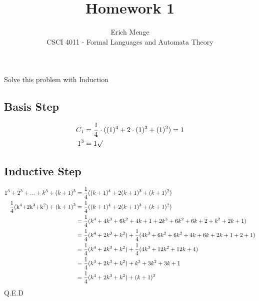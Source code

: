 \documentclass[12pt]{article}
\newenvironment{problem}[2][Problem]{\begin{trivlist}
\item[\hskip \labelsep {\bfseries #1}\hskip \labelsep {\bfseries #2.}]}{\end{trivlist}}
\begin{document}

\title{Homework 1}%
\author{Erich Menge\\ %
CSCI 4011 - Formal Languages and Automata Theory} %

\maketitle

\begin{problem}{1}
Solve this problem with Induction \\
\subsection*{Basis Step}
\begin{align*}
{C_1} &= \frac{1}{4} \cdot ({(1)^4} + 2 \cdot {(1)^3} + {(1)^2}) = 1\\
{1^3} &= 1\surd
\end{align*}
\subsection*{Inductive Step}
\begin{align*}
{1^3} + {2^3} + ... + {k^3} + {(k + 1)^3} &= \frac{1}{4}({(k + 1)^4} + 2{(k + 1)^3} + {(k + 1)^2})\\
\frac{1}{4}{\rm{(}}{{\rm{k}}^4}{\rm{  +  2}}{{\rm{k}}^3}{\rm{  +  }}{{\rm{k}}^2}{\rm{)  +  (k  +  1}}{{\rm{)}}^3} &= \frac{1}{4}({(k + 1)^4} + 2{(k + 1)^3} + {(k + 1)^2})\\
& = \frac{1}{4}({k^4} + 4{k^3} + 6{k^2} + 4k + 1 + 2{k^3} + 6{k^2} + 6k + 2 + {k^2} + 2k + 1)\\
& = \frac{1}{4}({k^4} + 2{k^3} + {k^2}) + \frac{1}{4}(4{k^3} + 6{k^2} + 6{k^2} + 4k + 6k + 2k + 1 + 2 + 1)\\
& = \frac{1}{4}({k^4} + 2{k^3} + {k^2}) + \frac{1}{4}(4{k^3} + 12{k^2} + 12k + 4)\\
& = \frac{1}{4}({k^4} + 2{k^3} + {k^2}) + {k^3} + 3{k^2} + 3k + 1\\
& = \frac{1}{4}({k^4} + 2{k^3} + {k^2}) + {(k + 1)^3}
\end{align*}
\hfill Q.E.D
\end{problem} \newpage
\end{document}
